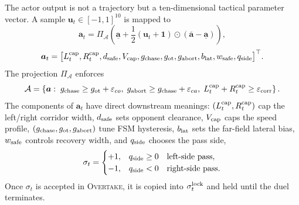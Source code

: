 \documentclass{iopjournal}
\begin{document}
The actor output is not a trajectory but a ten-dimensional tactical parameter
vector.  A sample $\bm{u}_t\in[-1,1]^{10}$ is mapped to
\begin{equation}
\bm{a}_t=\Pi_{\mathcal A}\!\left(
\underline{\bm{a}}+
\frac{1}{2}(\bm{u}_t+\bm{1})\odot(\overline{\bm{a}}-\underline{\bm{a}})
\right),
\label{eq:tanh_map}
\end{equation}
\begin{equation}
\bm{a}_t=
\bigl[
L_t^{\rm cap},R_t^{\rm cap},d_{\rm safe},V_{\rm cap},
g_{\rm chase},g_{\rm ot},g_{\rm abort},b_{\rm lat},w_{\rm safe},q_{\rm side}
\bigr]^\top .
\label{eq:action_vec}
\end{equation}
The projection $\Pi_{\mathcal A}$ enforces
\begin{equation}
\mathcal A=\left\{
\bm{a}:\;
g_{\rm chase}\ge g_{\rm ot}+\varepsilon_{co},\;
g_{\rm abort}\ge g_{\rm chase}+\varepsilon_{ca},\;
L_t^{\rm cap}+R_t^{\rm cap}\ge\varepsilon_{\rm corr}
\right\}.
\label{eq:safety_clip}
\end{equation}
The components of $\bm{a}_t$ have direct downstream meanings:
$(L_t^{\rm cap},R_t^{\rm cap})$ cap the left/right corridor width,
$d_{\rm safe}$ sets opponent clearance, $V_{\rm cap}$ caps the speed profile,
$(g_{\rm chase},g_{\rm ot},g_{\rm abort})$ tune FSM hysteresis, $b_{\rm lat}$
sets the far-field lateral bias, $w_{\rm safe}$ controls recovery width, and
$q_{\rm side}$ chooses the pass side,
\begin{equation}
\sigma_t=
\begin{cases}
+1, & q_{\rm side}\ge0\quad \text{left-side pass},\\
-1, & q_{\rm side}<0\quad \text{right-side pass}.
\end{cases}
\label{eq:side_sign}
\end{equation}
Once $\sigma_t$ is accepted in \textsc{Overtake}, it is copied into
$\sigma_t^{\rm lock}$ and held until the duel terminates.
\end{document}
